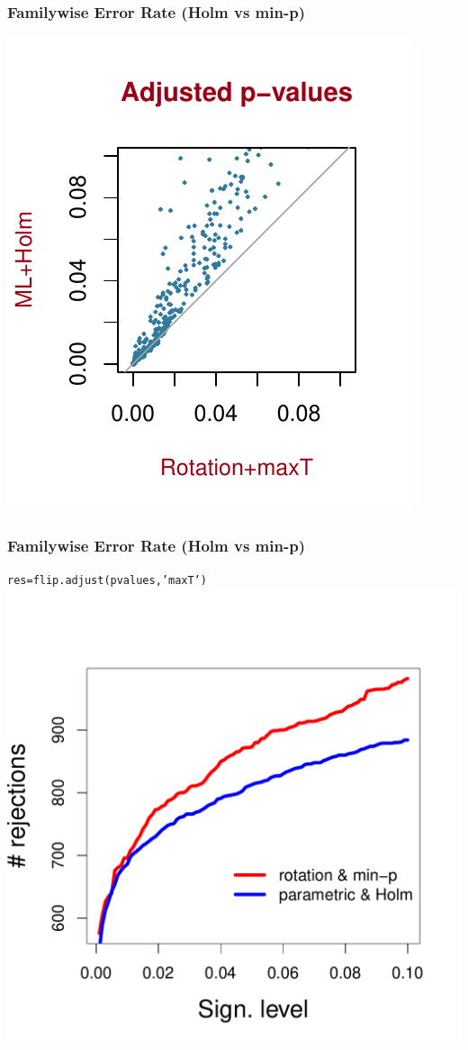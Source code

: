 \documentclass[xcolor={pdftex,dvipsnames,table}]{beamer}
\begin{document}
\begin{frame}[fragile]
\frametitle{Familywise Error Rate (Holm vs min-p)}
\begin{center}
\includegraphics[scale=1]{figures_perm_covariates/compareAdj10.pdf}
\end{center}

\end{frame}
\begin{frame}[fragile]
\frametitle{Familywise Error Rate (Holm vs min-p)}
\textcolor{myblue}{\tt res=flip.adjust(pvalues,'maxT')}
\includegraphics[scale=.45]{figures_perm_covariates/compareFWER2}

\end{frame}
\end{document}
